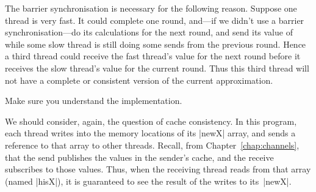 The barrier synchronisation is necessary for the following reason.  Suppose
one thread is very fast.  It could complete one round, and---if we didn't
use a barrier synchronisation---do its calculations for the next round, and
send its value of  while some slow thread is still doing some
sends from the previous round.  Hence a third thread could receive the fast
thread's value for the next round before it receives the slow thread's value
for the current round.  Thus this third thread will not have a complete or
consistent version of the current approximation. 

\begin{instruction}
Make sure you understand the implementation.
\end{instruction}


We should consider, again, the question of cache consistency.  
%
In this program, each thread writes into the memory locations of its |newX|
array, and sends a reference to that array to other threads.  Recall, from
Chapter~\ref{chap:channels}, that the send publishes the values in the
sender's cache, and the receive subscribes to those values.  Thus, when the
receiving thread reads from that array (named |hisX|), it is guaranteed to see
the result of the writes to its~|newX|.




